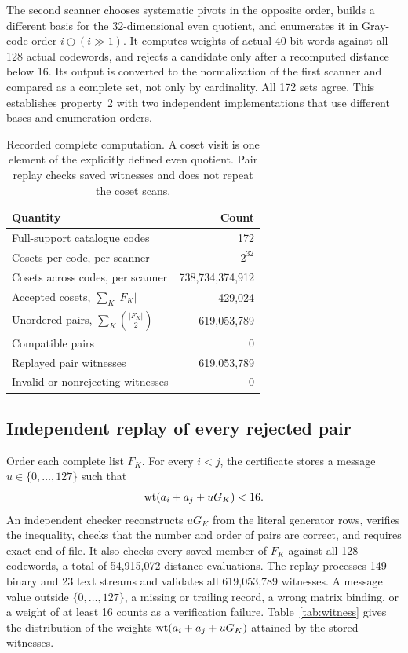 The second scanner chooses systematic pivots in the opposite order, builds a different basis for the 32-dimensional even quotient, and enumerates it in Gray-code order $i\oplus(i\gg1)$. It computes weights of actual 40-bit words against all 128 actual codewords, and rejects a candidate only after a recomputed distance below 16. Its output is converted to the normalization of the first scanner and compared as a complete set, not only by cardinality. All 172 sets agree. This establishes property~2 with two independent implementations that use different bases and enumeration orders.

\begin{table}[t]
\caption{Recorded complete computation. A coset visit is one element of the explicitly defined even quotient. Pair replay checks saved witnesses and does not repeat the coset scans.}
\label{tab:compute}
\centering\small
\begin{tabular}{@{}lr@{}}
\toprule
Quantity & Count\\
\midrule
Full-support catalogue codes & 172\\
Cosets per code, per scanner & $2^{32}$\\
Cosets across codes, per scanner & 738,734,374,912\\
Accepted cosets, $\sum_K|F_K|$ & 429,024\\
Unordered pairs, $\sum_K\binom{|F_K|}{2}$ & 619,053,789\\
Compatible pairs & 0\\
Replayed pair witnesses & 619,053,789\\
Invalid or nonrejecting witnesses & 0\\
\bottomrule
\end{tabular}
\end{table}

\subsection{Independent replay of every rejected pair}\label{sec:replay}
Order each complete list $F_K$. For every $i<j$, the certificate stores a message $u\in\{0,\ldots,127\}$ such that
\begin{equation}\label{eq:witness}
 \operatorname{wt}(a_i+a_j+uG_K)<16.
\end{equation}
An independent checker reconstructs $uG_K$ from the literal generator rows, verifies the inequality, checks that the number and order of pairs are correct, and requires exact end-of-file. It also checks every saved member of $F_K$ against all 128 codewords, a total of 54,915,072 distance evaluations. The replay processes 149 binary and 23 text streams and validates all 619,053,789 witnesses. A message value outside $\{0,\ldots,127\}$, a missing or trailing record, a wrong matrix binding, or a weight of at least 16 counts as a verification failure. Table~\ref{tab:witness} gives the distribution of the weights $\operatorname{wt}(a_i+a_j+uG_K)$ attained by the stored witnesses.

